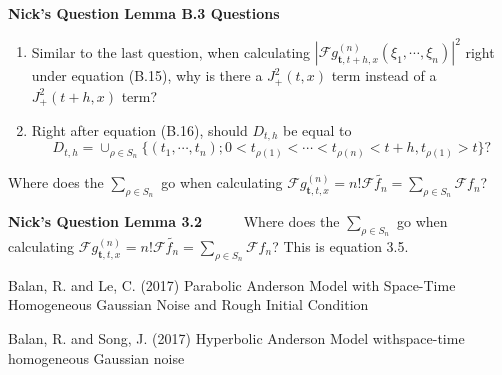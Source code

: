 \documentclass[a4paper,11pt]{article}
\numberwithin{equation}{section}
\theoremstyle{plain}
\theoremstyle{definition}
\newcounter{NQ}
\newenvironment{NickQuestion}[1][] %
{\refstepcounter{NQ}
	\begin{mdframed}[backgroundcolor=lightgray]\textbf{Nick's Question \theNQ \: #1~~}~~~\noindent}%
	{\end{mdframed}}
\numberwithin{NQ}{section}
\numberwithin{LQ}{section}
\numberwithin{ZQ}{section}
\begin{document}
\begin{NickQuestion}[Lemma B.3 Questions]
\begin{enumerate}
\noindent\textbf{Relation to Raluca's paper \cite{BS2017}:} The corresponding result is found in Lemma 7.2 \cite{BS2017}. The proof is exactly the same up until Raluca's equation (80). However in equation (81), you can see that Raluca took a different approach to bound $\psi_{t,h,x}^{(n)}(\textbf{t,t})$ and in return the $A_n(t,h,x)$ function.

\textbf{Underline (2):} Why are we able to factor as was done in this step. Shouldn't we say that 
	\begin{align*}
			| \mathcal{F} & (g_{ \textbf{t}, t+h, x }^{(n)}  - g_{ \textbf{t}, t, x }^{(n)} ) (\xi_1 , \cdots , \xi_n)|^2 
			\\= \bigg| \lambda^n \prod_{k=1}^n & \exp\left( -\frac{1}{2}\frac{ t_{\rho(k+1)}  - t_{\rho(k)} }{ t_{\rho(k)}t_{\rho(k+1)} } \left| \sum_{j=1}^k t_{\rho(j)}\xi_{\rho(j)} \right|^2 \right) \cdots
			\\& - \lambda^n \prod_{k=1}^n \exp\left( -\frac{1}{2}\frac{ t_{\sigma(k+1)}  - t_{\sigma(k)} }{ t_{\sigma(k)}t_{\sigma(k+1)} } \left| \sum_{j=1}^k t_{\sigma(j)}\xi_{\sigma(j)} \right|^2 \right) \cdots \bigg|^2.	\end{align*}
In other words, the permutations are different so we can't factor like is done to get the first inequality after equation (B.11). 
	\item Similar to the last question, when calculating $ |\mathcal{F} g_{ \textbf{t}, t+h, x }^{(n)}(\xi_1, \cdots, \xi_n)|^2 $ right under equation (B.15), why is there a $J_+^2(t,x)$ term instead of a $J_+^2(t+h,x)$ term?  

	\item Right after equation (B.16), should $D_{t,h}$ be equal to 
		\[
			D_{t,h} = \cup_{\rho \in S_n} \{ (t_1, \cdots, t_n) ; 0 < t_{\rho(1)} < \cdots < t_{\rho(n)} < t+h , t_{\rho(1)} > t \}?
		\]
\end{enumerate}
\end{NickQuestion}[Lemma 3.2] Where does the $\sum_{\rho \in S_n}$ go when calculating $\mathcal{F}g_{\textbf{t},t,x}^{(n)} = n!\mathcal{F}\tilde{f_n} = \sum_{\rho \in S_n}\mathcal{F}f_n$?

\begin{NickQuestion}[Lemma 3.2]
	Where does the $\sum_{\rho \in S_n}$ go when calculating $\mathcal{F}g_{\textbf{t},t,x}^{(n)} = n!\mathcal{F}\tilde{f_n} = \sum_{\rho \in S_n}\mathcal{F}f_n$? This is equation 3.5. 
\end{NickQuestion}

\begin{thebibliography}{999}
	Balan, R. and Le, C. (2017)
	\newblock Parabolic Anderson Model with Space-Time Homogeneous Gaussian Noise and Rough Initial Condition
	
	Balan, R. and Song, J. (2017)
	\newblock Hyperbolic Anderson Model withspace-time homogeneous Gaussian noise
\end{thebibliography}
\end{document}
